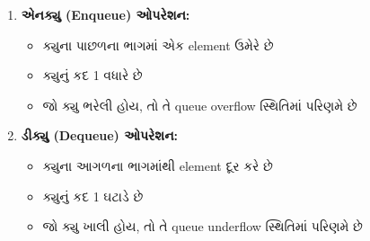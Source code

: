 \begin{enumerate}
\def\labelenumi{\arabic{enumi}.}
\tightlist
\item
  \textbf{એનક્યુ (Enqueue) ઓપરેશન:}

  \begin{itemize}
  \tightlist
  \item
    ક્યુના પાછળના ભાગમાં એક element ઉમેરે છે
  \item
    ક્યુનું કદ 1 વધારે છે
  \item
    જો ક્યુ ભરેલી હોય, તો તે queue overflow સ્થિતિમાં પરિણમે છે
  \end{itemize}

\begin{Shaded}
\begin{Highlighting}[]
     \OperatorTok{\textless{}}
    \NormalTok{:}
        \NormalTok{(}\NormalTok{)}
\end{Highlighting}
\end{Shaded}
\item
  \textbf{ડીક્યુ (Dequeue) ઓપરેશન:}

  \begin{itemize}
  \tightlist
  \item
    ક્યુના આગળના ભાગમાંથી element દૂર કરે છે
  \item
    ક્યુનું કદ 1 ઘટાડે છે
  \item
    જો ક્યુ ખાલી હોય, તો તે queue underflow સ્થિતિમાં પરિણમે છે
  \end{itemize}

\begin{Shaded}
\begin{Highlighting}[]
     
        \NormalTok{)}
    \NormalTok{:}
        \NormalTok{(}\NormalTok{)}
         
\end{Highlighting}
\end{Shaded}
\end{enumerate}

\begin{Shaded}
\begin{Highlighting}[]
\end{Highlighting}
\end{Shaded}

